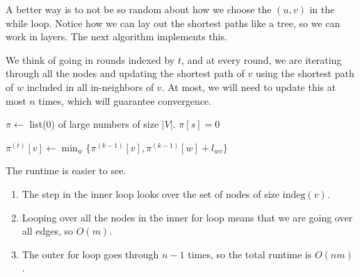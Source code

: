   A better way is to not be so random about how we choose the $(u, v)$ in the while loop. Notice how we can lay out the shortest paths like a tree, so we can work in layers. The next algorithm implements this. 

  \begin{algo}
    We think of going in rounds indexed by $t$, and at every round, we are iterating through all the nodes and updating the shortest path of $v$ using the shortest path of $w$ included in all in-neighbors of $v$. At most, we will need to update this at most $n$ times, which will guarantee convergence.  
    \begin{algorithm}[H]
      \label{alg:bellman_ford}
      \begin{algorithmic}[1]
        \State $\pi \gets$ list(0) of large numbers of size $|V|$. 
        \State $\pi[s] = 0$

              \State $\pi^{(t)} [v] \gets \min_w \{ \pi^{(k-1)} [v], \pi^{(k-1)}[w] + l_{wv}\}$
            \EndFor 
          \EndFor
        \EndFunction
      \end{algorithmic}
    \end{algorithm}
    The runtime is easier to see. 
    \begin{enumerate}
      \item The step in the inner loop looks over the set of nodes of size $\mathrm{indeg}(v)$. 
      \item Looping over all the nodes in the inner for loop means that we are going over all edges, so $O(m)$. 
      \item The outer for loop goes through $n-1$ times, so the total runtime is $O(nm)$. 
    \end{enumerate}
  \end{algo}

